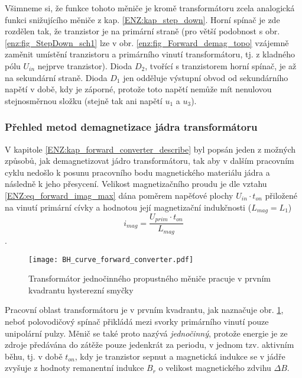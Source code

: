       \begin{note}
        Všimneme si, že funkce tohoto měniče je kromě transformátoru zcela analogická funkci
        snižujícího měniče z kap. \ref{ENZ:kap_step_down}. Horní spínač je zde rozdělen tak, že
        tranzistor je na primární straně (pro větší podobnost s obr. \ref{enz:fig_StepDown_sch1}
        lze v obr. \ref{enz:fig_Forward_demag_topo} vzájemně zaměnit umístění tranzistoru a        
        primárního vinutí transformátoru, tj. z kladného pólu $U_{in}$ nejprve tranzistor). Dioda
        $D_2$, tvořící s tranzistorem horní spínač, je až na sekundární straně. Dioda $D_1$ jen
        odděluje výstupní obvod od sekundárního napětí v době, kdy je záporné, protože  toto napětí
        nemůže mít nenulovou stejnosměrnou složku (stejně tak ani napětí $u_1$ a $u_3$).
      \end{note}
  
    \subsubsection{Přehled metod demagnetizace jádra transformátoru}
      V kapitole \ref{ENZ:kap_forward_converter_describe} byl popsán jeden z možných způsobů, jak
      demagnetizovat jádro transformátoru, tak aby v dalším pracovním cyklu nedošlo k posunu
      pracovního bodu magnetického materiálu jádra a následně k jeho přesycení. Velikost
      magnetizačního proudu je dle vztahu \ref{ENZ:eq_forward_imag_max} dána poměrem napěťové plochy
      $U_{in}\cdot t_{on}$ přiložené na vinutí primární cívky a hodnotou její magnetizační
      indukčnosti ($L_{mag} = L_{1}$) $$i_{mag} = \frac{U_{prim}\cdot{t_{on}}}{L_{mag}}$$.
      
      \begin{figure}[ht!]
       \centering
       \texttt{[image: BH\_curve\_forward\_converter.pdf]}
       \caption[Hysterezní smyčka]{Transformátor jednočinného propustného měniče pracuje v prvním
                kvadrantu hysterezní smyčky}
       \label{enz:fig_Forward_Hyst_loop}
      \end{figure}  
      
      Pracovní oblast transformátoru je v prvním kvadrantu, jak naznačuje obr.
      \ref{enz:fig_Forward_Hyst_loop}, neboť polovodičový spínač přikládá mezi svorky primárního
      vinutí pouze unipolární pulzy. Měnič se také proto nazývá \emph{jednočinný}, protože energie je
      ze zdroje předávána do zátěže pouze jedenkrát za periodu, v jednom tzv. aktivním běhu, tj. v
      době $t_{on}$, kdy je tranzistor sepnut a magnetická indukce se v jádře zvyšuje z hodnoty
      remanentní indukce $B_r$ o velikost magnetického zdvihu $\Delta B$.
      
